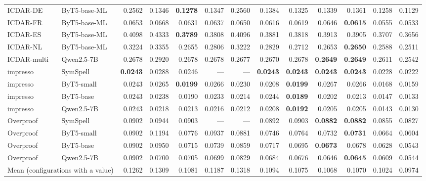 \begin{tabular}{llrrrrrrrrrrr}
\addlinespace[2pt]
ICDAR-DE & ByT5-base-ML & 0.2562 & 0.1346 & \textbf{0.1278} & 0.1347 & 0.2560 & 0.1384 & 0.1325 & 0.1339 & 0.1361 & 0.1258 & 0.1129 \\
\addlinespace[2pt]
ICDAR-FR & ByT5-base-ML & 0.0653 & 0.0668 & 0.0631 & 0.0637 & 0.0650 & 0.0616 & 0.0619 & 0.0646 & \textbf{0.0615} & 0.0555 & 0.0533 \\
\addlinespace[2pt]
ICDAR-ES & ByT5-base-ML & 0.4098 & 0.4333 & \textbf{0.3789} & 0.3808 & 0.4096 & 0.3881 & 0.3818 & 0.3913 & 0.3905 & 0.3707 & 0.3656 \\
\addlinespace[2pt]
ICDAR-NL & ByT5-base-ML & 0.3224 & 0.3355 & 0.2655 & 0.2806 & 0.3222 & 0.2829 & 0.2712 & 0.2653 & \textbf{0.2650} & 0.2588 & 0.2511 \\
\addlinespace[2pt]
ICDAR-multi & Qwen2.5-7B & 0.2678 & 0.2920 & 0.2678 & 0.2678 & 0.2677 & 0.2670 & 0.2678 & \textbf{0.2649} & \textbf{0.2649} & 0.2611 & 0.2542 \\
\addlinespace[2pt]
impresso & SymSpell & \textbf{0.0243} & 0.0288 & 0.0246 & — & — & \textbf{0.0243} & \textbf{0.0243} & \textbf{0.0243} & \textbf{0.0243} & 0.0228 & 0.0222 \\
impresso & ByT5-small & 0.0243 & 0.0265 & \textbf{0.0199} & 0.0266 & 0.0230 & 0.0208 & \textbf{0.0199} & 0.0267 & 0.0266 & 0.0168 & 0.0159 \\
impresso & ByT5-base & 0.0243 & 0.0238 & 0.0190 & 0.0233 & 0.0214 & 0.0244 & \textbf{0.0189} & 0.0202 & 0.0213 & 0.0147 & 0.0133 \\
impresso & Qwen2.5-7B & 0.0243 & 0.0218 & 0.0213 & 0.0216 & 0.0212 & 0.0208 & \textbf{0.0192} & 0.0205 & 0.0205 & 0.0143 & 0.0130 \\
\addlinespace[2pt]
Overproof & SymSpell & 0.0902 & 0.0944 & 0.0903 & — & — & 0.0892 & 0.0903 & \textbf{0.0882} & \textbf{0.0882} & 0.0855 & 0.0827 \\
Overproof & ByT5-small & 0.0902 & 0.1194 & 0.0776 & 0.0937 & 0.0881 & 0.0746 & 0.0764 & 0.0732 & \textbf{0.0731} & 0.0664 & 0.0604 \\
Overproof & ByT5-base & 0.0902 & 0.0950 & 0.0715 & 0.0739 & 0.0859 & 0.0717 & 0.0695 & \textbf{0.0673} & 0.0678 & 0.0628 & 0.0543 \\
Overproof & Qwen2.5-7B & 0.0902 & 0.0700 & 0.0705 & 0.0699 & 0.0829 & 0.0684 & 0.0676 & 0.0646 & \textbf{0.0645} & 0.0609 & 0.0544 \\
\midrule
\multicolumn{2}{l}{Mean (configurations with a value)} & 0.1262 & 0.1309 & 0.1081 & 0.1187 & 0.1318 & 0.1094 & 0.1075 & 0.1068 & 0.1070 & 0.1024 & 0.0974 \\
\bottomrule
\end{tabular}
